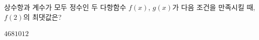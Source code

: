 상수항과 계수가 모두 정수인 두 다항함수 $f(x)$, $g(x)$가 다음 조건을 만족시킬 때, $f(2)$의 최댓값은? 
\begin{choices32}{$4$}{$6$}{$8$}{$10$}{$12$}\end{choices32}

